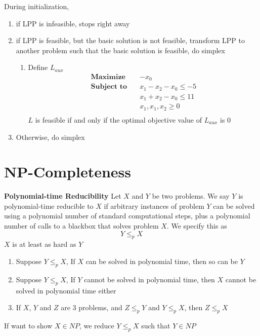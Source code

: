 \documentclass[11pt]{article}
\begin{document}
\begin{defn*}
    During initialization, 
    \begin{enumerate}
        \item if LPP is infeasible, stops right away
        \item if LPP is feasible, but the basic solution is not feasible, transform LPP to another problem such that the basic solution is feasible, do simplex
        \begin{enumerate}
            \item Define $L_{aux}$ 
            \begin{align*}
                \textbf{Maximize} \quad & -x_0 \\
                \textbf{Subject to} \quad & x_1 - x_2 - x_0 \leq -5 \\
                                            & x_1 + x_2 - x_0  \leq 11\\
                                            & x_1, x_1, x_2 \geq 0 \\ 
            \end{align*}
            $L$ is feasible if and only if the optimal objective value of $L_{aux}$ is 0
        \end{enumerate}
        \item Otherwise, do simplex
    \end{enumerate}
\end{defn*}


\section*{NP-Completeness} 

\begin{defn*}
    \textbf{Polynomial-time Reducibility}
    Let $X$ and $Y$ be two problems. We say $Y$ is polynomial-time reducible to $X$ if arbitrary instances of problem $Y$ can be solved using a polynomial number of standard computational steps, plus a polynomial number of calls to a blackbox that solves problem $X$. We specify this as 
    \[
        Y \leq_p X
    \]
    $X$ is at least as hard as $Y$
    \begin{enumerate}
        \item Suppose $Y \leq_p X$, If $X$ can be solved in polynomial time, then so can be $Y$
        \item Suppose $Y \leq_p X$, If $Y$ cannot be solved in polynomial time, then $X$ cannot be solved in polynomial time either
        \item If $X$, $Y$ and $Z$ are 3 problems, and $Z\leq_p Y$ and $Y\leq_p X$, then $Z\leq_p X$
    \end{enumerate}
    If want to show $X\in NP$, we reduce $Y\leq_p X$ such that $Y\in NP$ 
\end{defn*}
\end{document}
